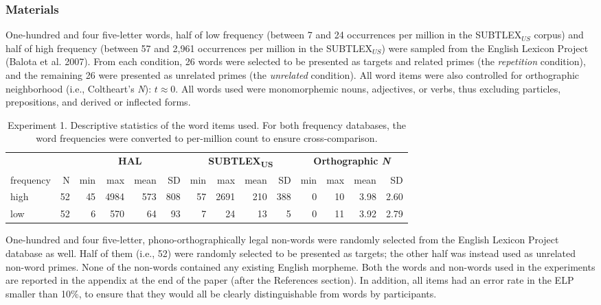 \documentclass[
]{interact}
\begin{document}
\subsubsection{Materials}\label{sec-exp1-methods-materials}

One-hundred and four five-letter words, half of low frequency (between 7
and 24 occurrences per million in the SUBTLEX\(_{US}\) corpus) and half
of high frequency (between 57 and 2,961 occurrences per million in the
SUBTLEX\(_{US}\)) were sampled from the English Lexicon Project (Balota
et al. 2007). From each condition, 26 words were selected to be
presented as targets and related primes (the \emph{repetition}
condition), and the remaining 26 were presented as unrelated primes (the
\emph{unrelated} condition). All word items were also controlled for
orthographic neighborhood (i.e., Coltheart's \emph{N}): \(t \approx 0\).
All words used were monomorphemic nouns, adjectives, or verbs, thus
excluding particles, prepositions, and derived or inflected forms.

\begin{longtable}{lrrrrrrrrrrrrr}

\caption{\label{tbl-words_exp1}Experiment 1. Descriptive statistics of
the word items used. For both frequency databases, the word frequencies
were converted to per-million count to ensure cross-comparison.}

\tabularnewline

\toprule
 &  & \multicolumn{4}{c}{\textbf{HAL}} & \multicolumn{4}{c}{\textbf{SUBTLEX\textsubscript{US}}} & \multicolumn{4}{c}{\textbf{Orthographic \emph{N}}} \\ 
\cmidrule(lr){3-6} \cmidrule(lr){7-10} \cmidrule(lr){11-14}
frequency & N & min & max & mean & SD & min & max & mean & SD & min & max & mean & SD \\ 
\midrule\addlinespace[2.5pt]
high & 52 & 45 & 4984 & 573 & 808 & 57 & 2691 & 210 & 388 & 0 & 10 & 3.98 & 2.60 \\ 
low & 52 & 6 & 570 & 64 & 93 & 7 & 24 & 13 & 5 & 0 & 11 & 3.92 & 2.79 \\ 
\bottomrule

\end{longtable}

One-hundred and four five-letter, phono-orthographically legal non-words
were randomly selected from the English Lexicon Project database as
well. Half of them (i.e., 52) were randomly selected to be presented as
targets; the other half was instead used as unrelated non-word primes.
None of the non-words contained any existing English morpheme. Both the
words and non-words used in the experiments are reported in the appendix
at the end of the paper (after the References section). In addition, all
items had an error rate in the ELP smaller than 10\%, to ensure that
they would all be clearly distinguishable from words by participants.
\end{document}
